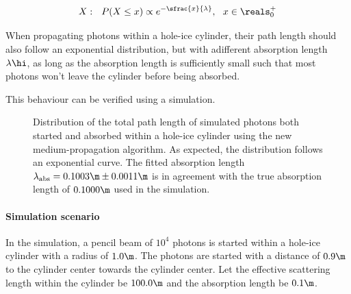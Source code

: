 \begin{equation}
  X: \ \ P(X \leq x) \propto e^{- \sfrac{x}{\lambda}}, \ \ x \in \reals^+_0
\end{equation}

When propagating photons within a hole-ice cylinder, their path length should also follow an exponential distribution, but with adifferent absorption length $\lambda\hi$, as long as the absorption length is sufficiently small such that most photons won't leave the cylinder before being absorbed.

This behaviour can be verified using a simulation. %

\begin{figure}[htb]
  \caption{Distribution of the total path length of simulated photons both started and absorbed within a hole-ice cylinder using the new medium-propagation algorithm. As expected, the distribution follows an exponential curve. The fitted absorption length $\lambda_\text{abs}=0.1003\m \pm 0.0011\m$ is in agreement with the true absorption length of $0.1000\m$ used in the simulation.}
\end{figure}

\paragraph{Simulation scenario} In the simulation, a pencil beam of $10^4$ photons is started within a hole-ice cylinder with a radius of $1.0\m$. The photons are started with a distance of $0.9\m$ to the cylinder center towards the cylinder center. Let the effective scattering length within the cylinder be $100.0\m$ and the absorption length be $0.1\m$.




